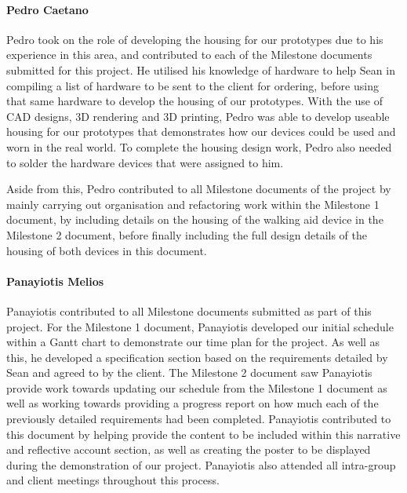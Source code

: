                 \paragraph{Pedro Caetano}\mbox{}

                Pedro took on the role of developing the housing for our prototypes due to his experience in this area, and contributed to each of the Milestone documents submitted for this project. He utilised his knowledge of hardware to help Sean in compiling a list of hardware to be sent to the client for ordering, before using that same hardware to develop the housing of our prototypes. With the use of CAD designs, 3D rendering and 3D printing, Pedro was able to develop useable housing for our prototypes that demonstrates how our devices could be used and worn in the real world. To complete the housing design work, Pedro also needed to solder the hardware devices that were assigned to him.

                Aside from this, Pedro contributed to all Milestone documents of the project by mainly carrying out organisation and refactoring work within the Milestone 1 document, by including details on the housing of the walking aid device in the Milestone 2 document, before finally including the full design details of the housing of both devices in this document.

                \paragraph{Panayiotis Melios}\mbox{}

                Panayiotis contributed to all Milestone documents submitted as part of this project. For the Milestone 1 document, Panayiotis developed our initial schedule within a Gantt chart to demonstrate our time plan for the project. As well as this, he developed a specification section based on the requirements detailed by Sean and agreed to by the client. The Milestone 2 document saw Panayiotis provide work towards updating our schedule from the Milestone 1 document as well as working towards providing a progress report on how much each of the previously detailed requirements had been completed. Panayiotis contributed to this document by helping provide the content to be included within this narrative and reflective account section, as well as creating the poster to be displayed during the demonstration of our project. Panayiotis also attended all intra-group and client meetings throughout this process. 

